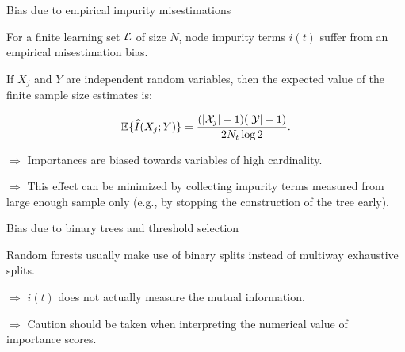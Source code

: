 \documentclass{beamer}
\begin{document}
\begin{frame}{Bias due to empirical impurity misestimations}

For a finite learning set ${\cal L}$ of size $N$, node impurity terms $i(t)$
suffer from an empirical misestimation bias.

\bigskip

If $X_j$ and $Y$ are independent random variables, then the expected value of
the finite sample size estimates   is:

\begin{equation*}
\mathbb{E}\{ \widehat{I}(X_j; Y) \} = \frac{(|{\cal X}_j|-1)(|{\cal Y}|-1)}{2 N_t \log 2}.
\end{equation*}

{\color{blue}$\Rightarrow$ Importances are biased towards variables of  high
cardinality.}

\medskip

{\color{blue}$\Rightarrow$ This effect can be minimized by collecting impurity
terms measured from large enough sample only (e.g., by stopping the
construction of the tree early).}

\end{frame}

\begin{frame}{Bias due to binary trees and threshold selection}

Random forests usually make use of binary splits instead of multiway exhaustive
splits.

\bigskip

{\color{blue}$\Rightarrow$ $i(t)$ does not actually measure the mutual
information.}

\bigskip

{\color{blue}$\Rightarrow$ Caution should be taken when interpreting the
numerical  value of importance scores.}

\end{frame}
\end{document}
